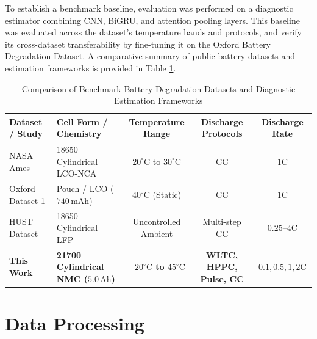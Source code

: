 \documentclass[conference]{IEEEtran}
\begin{document}
To establish a benchmark baseline, evaluation was performed on a diagnostic estimator combining CNN, BiGRU, and attention pooling layers.
This baseline was evaluated across the dataset's temperature bands and protocols, and verify its cross-dataset transferability by fine-tuning it on the Oxford Battery Degradation Dataset.
A comparative summary of public battery datasets and estimation frameworks is provided in Table \ref{tab:related_works}.

\begin{table}[htbp]
	\caption{Comparison of Benchmark Battery Degradation Datasets and Diagnostic Estimation Frameworks}
	\label{tab:related_works}
	\centering
	\small
	\begin{tabular}{l l c c c}
		\hline
		\textbf{Dataset / Study} & \textbf{Cell Form / Chemistry}          & \textbf{Temperature Range} & \textbf{Discharge Protocols} & \textbf{Discharge Rate} \\
		\hline
		NASA Ames                & \makecell[l]{18650 Cylindrical                                                                                                \\ LCO-NCA} & $20^\circ\mathrm{C}$ to $30^\circ\mathrm{C}$ & CC & $1\text{C}$ \\
		\hline
		Oxford Dataset 1         & \makecell[l]{Pouch / LCO                                                                                                      \\ ($740\,\mathrm{mAh}$)} & $40^\circ\mathrm{C}$ (Static) & CC & $1\text{C}$ \\
		\hline
		HUST Dataset             & \makecell[l]{18650 Cylindrical                                                                                                \\ LFP} & Uncontrolled Ambient & Multi-step CC & $0.25$--$4\text{C}$ \\
		\hline
		\textbf{This Work}       & \makecell[l]{\textbf{21700 Cylindrical}                                                                                       \\ \textbf{NMC ($5.0\,\mathrm{Ah}$)}} & \textbf{$-20^\circ\mathrm{C}$ to $45^\circ\mathrm{C}$} & \textbf{WLTC, HPPC, Pulse, CC} & $0.1, 0.5, 1, 2\text{C}$ \\
		\hline
	\end{tabular}
\end{table}

\section{Data Processing}
\end{document}
